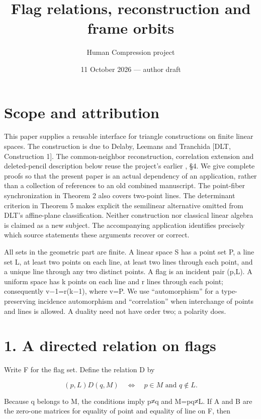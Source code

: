 \documentclass[
  11pt,
  a4paper,
]{article}
\title{Flag relations, reconstruction and frame orbits}
\author{Human Compression project}
\date{11 October 2026 --- author draft}
\renewcommand{\texttt}[1]{{\ttfamily\seqsplit{#1}}}
\begin{document}
\maketitle

\section{Scope and attribution}\label{scope-and-attribution}

This paper supplies a reusable interface for triangle constructions on
finite linear spaces. The construction is due to Delaby, Leemans and
Tranchida {[}DLT, Construction 1{]}. The common-neighbor reconstruction,
correlation extension and deleted-pencil description below reuse the
project's earlier \texttt{incidence\_compression.md}, §4. We give
complete proofs so that the present paper is an actual dependency of an
application, rather than a collection of references to an old combined
manuscript. The point-fiber synchronization in Theorem 2 also covers
two-point lines. The determinant criterion in Theorem 5 makes explicit
the semilinear alternative omitted from DLT's affine-plane
classification. Neither construction nor classical linear algebra is
claimed as a new subject. The accompanying application identifies
precisely which source statements these arguments recover or correct.

All sets in the geometric part are finite. A linear space S has a point
set P, a line set L, at least two points on each line, at least two
lines through each point, and a unique line through any two distinct
points. A flag is an incident pair (p,L). A uniform space has k points
on each line and r lines through each point; consequently v−1=r(k−1),
where v=\textbar P\textbar. We use ``automorphism'' for a
type-preserving incidence automorphism and ``correlation'' when
interchange of points and lines is allowed. A duality need not have
order two; a polarity does.

\section{1. A directed relation on
flags}\label{a-directed-relation-on-flags}

Write F for the flag set. Define the relation D by

\[
 (p,L)D(q,M)\quad\Longleftrightarrow\quad p\in M\text{ and }q\notin L.
\tag{1}
\]

Because q belongs to M, the conditions imply p≠q and M=pq≠L. If A and B
are the zero-one matrices for equality of point and equality of line on
F, then
\end{document}

